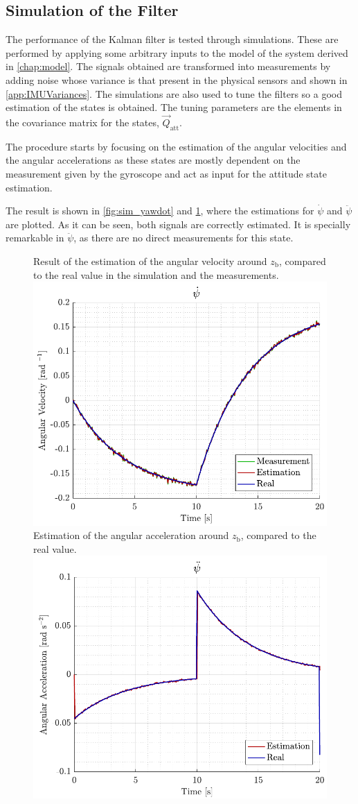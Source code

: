 \subsection{Simulation of the Filter}
The performance of the Kalman filter is tested through simulations. These are performed by applying some arbitrary inputs to the model of the system derived in \autoref{chap:model}. The signals obtained are transformed into measurements by adding noise whose variance is that present in the physical sensors and shown in \autoref{app:IMUVariances}. The simulations are also used to tune the filters so a good estimation of the states is obtained. The tuning parameters are the elements in the covariance matrix for the states, $\vec{Q}_\mathrm{att}$. 

The procedure starts by focusing on the estimation of the angular velocities and the angular accelerations as these states are mostly dependent on the measurement given by the gyroscope and act as input for the attitude state estimation.

The result is shown in \autoref{fig:sim_yawdot} and \ref{fig:sim_yawddot}, where the estimations for $\dot{\psi}$ and $\ddot{\psi}$ are plotted. As it can be seen, both signals are correctly estimated. It is specially remarkable in $\ddot{\psi}$, as there are no direct measurements for this state.
\begin{figure}[H]
	\captionbox 
	{   
		Result of the estimation of the angular velocity around $z_\mathrm{b}$, compared to the real value in the simulation and the measurements.
		\label{fig:sim_yawdot}
	}                                                                 
	{                                                                  
		\includegraphics[width=.45\textwidth]{figures/sim_yawdot}         
	}                                                                    
	\hspace{5pt}                                                          
	\captionbox  
	{      
		Estimation of the angular acceleration around $z_\mathrm{b}$, compared to the real value.
		\label{fig:sim_yawddot}
	}                                                                          
	{
		\includegraphics[width=.45\textwidth]{figures/sim_yawddot}
	}
\end{figure}

